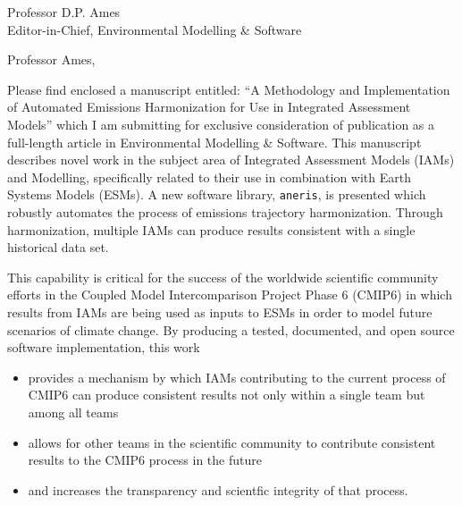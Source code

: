\documentclass[11pt]{letter} %
\begin{document}

\begin{letter}{Professor D.P. Ames\\
Editor-in-Chief, Environmental Modelling \& Software}


\address{Matthew Gidden\\
Laimgrubengasse 17/7\\
Vienna, Austria 1060}



\opening{Professor Ames,}

Please find enclosed a manuscript entitled: ``A Methodology and Implementation
of Automated Emissions Harmonization for Use in Integrated Assessment Models''
which I am submitting for exclusive consideration of publication as a
full-length article in Environmental Modelling \& Software.  This manuscript
describes novel work in the subject area of Integrated Assessment Models (IAMs)
and Modelling, specifically related to their use in combination with Earth
Systems Models (ESMs). A new software library, \texttt{aneris}, is presented
which robustly automates the process of emissions trajectory
harmonization. Through harmonization, multiple IAMs can produce results
consistent with a single historical data set.

This capability is critical for the success of the worldwide scientific
community efforts in the Coupled Model Intercomparison Project Phase 6 (CMIP6)
in which results from IAMs are being used as inputs to ESMs in order to model
future scenarios of climate change. By producing a tested, documented, and open
source software implementation, this work

\begin{itemize}
  \item provides a mechanism by which IAMs contributing to the current process
    of CMIP6 can produce consistent results not only within a single team but
    among all teams
  \item allows for other teams in the scientific community to contribute
    consistent results to the CMIP6 process in the future
  \item and increases the transparency and scientfic integrity of that process.
\end{itemize}


\end{letter}
\end{document}
